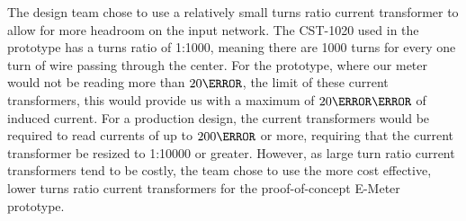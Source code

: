 The design team chose to use a relatively small turns ratio current transformer to allow for more headroom on the input network. The CST-1020 used in the prototype has a turns ratio of 1:1000, meaning there are 1000 turns for every one turn of wire passing through the center. For the prototype, where our meter would not be reading more than $20\ampere$, the limit of these current transformers, this would provide us with a maximum of $20\milli\ampere$ of induced current. For a production design, the current transformers would be required to read currents of up to $200\ampere$ or more, requiring that the current transformer be resized to 1:10000 or greater. However, as large turn ratio current transformers tend to be costly, the team chose to use the more cost effective, lower turns ratio current transformers for the proof-of-concept E-Meter prototype.


